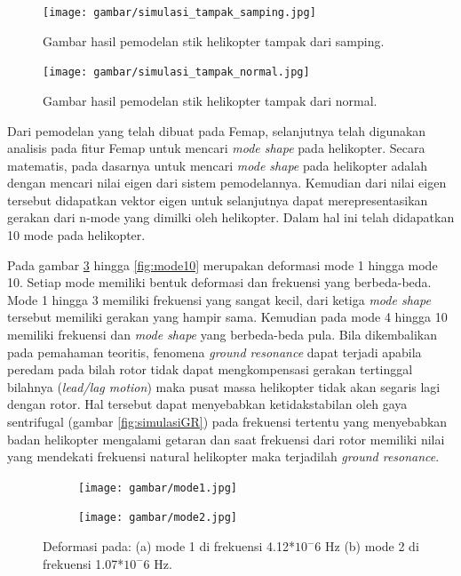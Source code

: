 \begin{figure}[H]
	\centering
	\texttt{[image: gambar/simulasi\_tampak\_samping.jpg]}
	\caption{Gambar hasil pemodelan stik helikopter tampak dari samping.}
	\label{fig:simulasi_tampak_samping}
\end{figure}

\begin{figure}[H]
	\centering
	\texttt{[image: gambar/simulasi\_tampak\_normal.jpg]}
	\caption{Gambar hasil pemodelan stik helikopter tampak dari normal.}
	\label{fig:simulasi_tampak_normal}
\end{figure}

Dari pemodelan yang telah dibuat pada Femap, selanjutnya telah digunakan analisis pada fitur Femap untuk mencari \textit{mode shape} pada helikopter. Secara matematis, pada dasarnya untuk mencari \textit{mode shape} pada helikopter adalah dengan mencari nilai eigen dari sistem pemodelannya. Kemudian dari nilai eigen tersebut didapatkan vektor eigen untuk selanjutnya dapat merepresentasikan gerakan dari n-mode yang dimilki oleh helikopter. Dalam hal ini telah didapatkan 10 mode pada helikopter.

Pada gambar \ref{fig:mode1} hingga \ref{fig:mode10} merupakan deformasi mode 1 hingga mode 10. Setiap mode memiliki bentuk deformasi dan frekuensi yang berbeda-beda. Mode 1 hingga 3 memiliki frekuensi yang sangat kecil, dari ketiga \textit{mode shape} tersebut memiliki gerakan yang hampir sama. Kemudian pada mode 4 hingga 10 memiliki frekuensi dan \textit{mode shape} yang berbeda-beda pula. Bila dikembalikan pada pemahaman teoritis, fenomena \textit{ground resonance} dapat terjadi apabila peredam pada bilah rotor tidak dapat mengkompensasi gerakan tertinggal bilahnya (\textit{lead/lag motion}) maka pusat massa helikopter tidak akan segaris lagi dengan rotor. Hal tersebut dapat menyebabkan ketidakstabilan oleh gaya sentrifugal (gambar \ref{fig:simulasiGR}) pada frekuensi tertentu yang menyebabkan badan helikopter mengalami getaran dan saat frekuensi dari rotor memiliki nilai yang mendekati frekuensi natural helikopter maka terjadilah \textit{ground resonance}.

\begin{figure}[H]
	\begin{subfigure}{0.49\textwidth}
		\centering
		\texttt{[image: gambar/mode1.jpg]}
		\caption{}
		\label{fig:mode1}
	\end{subfigure}
	\centering
	\begin{subfigure}{0.49\textwidth}
		\centering
		\texttt{[image: gambar/mode2.jpg]}
		\caption{}
		\label{fig:mode2}
	\end{subfigure}
	\caption{Deformasi pada: (a) mode 1 di frekuensi 4.12*$10^-6$ Hz (b) mode 2 di frekuensi 1.07*$10^-6$ Hz.}
	\label{fig:modeshape1}
\end{figure}

